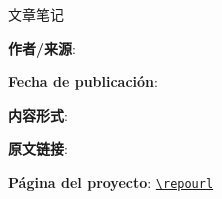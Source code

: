 
\begin{titlepage}
\centering
{\Large 文章笔记\par}
\vspace{1.2cm}
{\huge\bfseries \notetitle\par}
\vspace{0.8cm}
{\large \noteauthors\par}
\vspace{0.3cm}
{\large \notedate\par}
\vspace{1.2cm}

\vfill
\begin{tcolorbox}[width=0.9\textwidth, colback=black!2!white, colframe=black!60, sharp corners]
\textbf{作者/来源}: \videochannel\par
\textbf{Fecha de publicación}: \videopublishdate\par
\textbf{内容形式}: \videoduration\par
\textbf{原文链接}: \ifdefempty{\videourl}{}{
\href{\videourl}{\nolinkurl{\videourl}}
}
\par
\textbf{Página del proyecto}: \href{\repourl}{\nolinkurl{\repourl}}\par
\end{tcolorbox}
\end{titlepage}

\tableofcontents
\newpage


